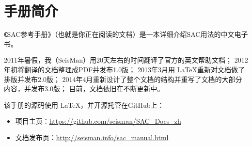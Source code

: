 \section{手册简介}
《SAC参考手册》（也就是你正在阅读的文档）是一本详细介绍SAC用法的中文电子书。

2011年暑假，我（SeisMan）用20天左右的时间翻译了官方的英文帮助文档；
2012年初将翻译的文档整理成PDF并发布1.0版；
2013年3月用 \LaTeX 重新对文档做了排版并发布2.0版；
2014年4月重新设计了整个文档的结构并重写了文档的大部分内容，并发布3.0版；
目前，文档依旧在不断更新中。

该手册的源码使用 \LaTeX ，并开源托管在GitHub上：
\begin{itemize}
\item 项目主页：\url{https://github.com/seisman/SAC_Docs_zh}
\item 文档发布页：\url{http://seisman.info/sac_manual.html}
\end{itemize}
